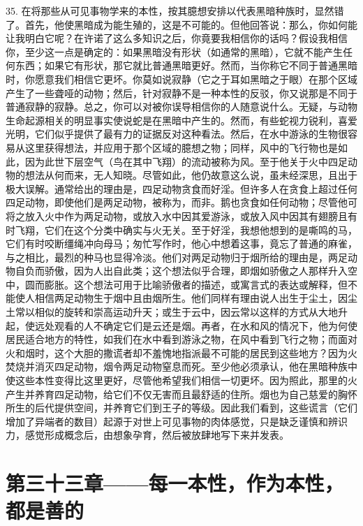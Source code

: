 35. 在将那些从可见事物学来的本性，按其臆想安排以代表黑暗种族时，显然错了。首先，他使黑暗成为能生殖的，这是不可能的。但他回答说：那么，你如何能让我明白它呢？在许诺了这么多知识之后，你竟要我相信你的话吗？假设我相信你，至少这一点是确定的：如果黑暗没有形状（如通常的黑暗），它就不能产生任何东西；如果它有形状，那它就比普通黑暗更好。然而，当你称它不同于普通黑暗时，你愿意我们相信它更坏。你莫如说寂静（它之于耳如黑暗之于眼）在那个区域产生了一些聋哑的动物；然后，针对寂静不是一种本性的反驳，你又说那是不同于普通寂静的寂静。总之，你可以对被你误导相信你的人随意说什么。无疑，与动物生命起源相关的明显事实使说蛇是在黑暗中产生的。然而，有些蛇视力锐利，喜爱光明，它们似乎提供了最有力的证据反对这种看法。然后，在水中游泳的生物很容易从这里获得想法，并应用于那个区域的臆想之物；同样，风中的飞行物也是如此，因为此世下层空气（鸟在其中飞翔）的流动被称为风。至于他关于火中四足动物的想法从何而来，无人知晓。尽管如此，他仍故意这么说，虽未经深思，且出于极大误解。通常给出的理由是，四足动物贪食而好淫。但许多人在贪食上超过任何四足动物，即使他们是两足动物，被称为，而非。鹅也贪食如任何动物；尽管他可将之放入火中作为两足动物，或放入水中因其爱游泳，或放入风中因其有翅膀且有时飞翔，它们在这个分类中确实与火无关。至于好淫，我想他想到的是嘶鸣的马，它们有时咬断缰绳冲向母马；匆忙写作时，他心中想着这事，竟忘了普通的麻雀，与之相比，最烈的种马也显得冷淡。他们对两足动物归于烟所给的理由是，两足动物自负而骄傲，因为人出自此类；这个想法似乎合理，即烟如骄傲之人那样升入空中，圆而膨胀。这个想法可用于比喻骄傲者的描述，或寓言式的表达或解释，但不能使人相信两足动物生于烟中且由烟所生。他们同样有理由说人出生于尘土，因尘土常以相似的旋转和崇高运动升天；或生于云中，因云常以这样的方式从大地升起，使远处观看的人不确定它们是云还是烟。再者，在水和风的情况下，他为何使居民适合地方的特性，如我们在水中看到游泳之物，在风中看到飞行之物；而面对火和烟时，这个大胆的撒谎者却不羞愧地指派最不可能的居民到这些地方？因为火焚烧并消灭四足动物，烟令两足动物窒息而死。至少他必须承认，他在黑暗种族中使这些本性变得比这里更好，尽管他希望我们相信一切更坏。因为照此，那里的火产生并养育四足动物，给它们不仅无害而且最舒适的住所。烟也为自己慈爱的胸怀所生的后代提供空间，并养育它们到王子的等级。因此我们看到，这些谎言（它们增加了异端者的数目）起源于对世上可见事物的肉体感觉，只是缺乏谨慎和辨识力，感觉形成概念后，由想象孕育，然后被放肆地写下来并发表。\par


\section{第三十三章——每一本性，作为本性，都是善的}


